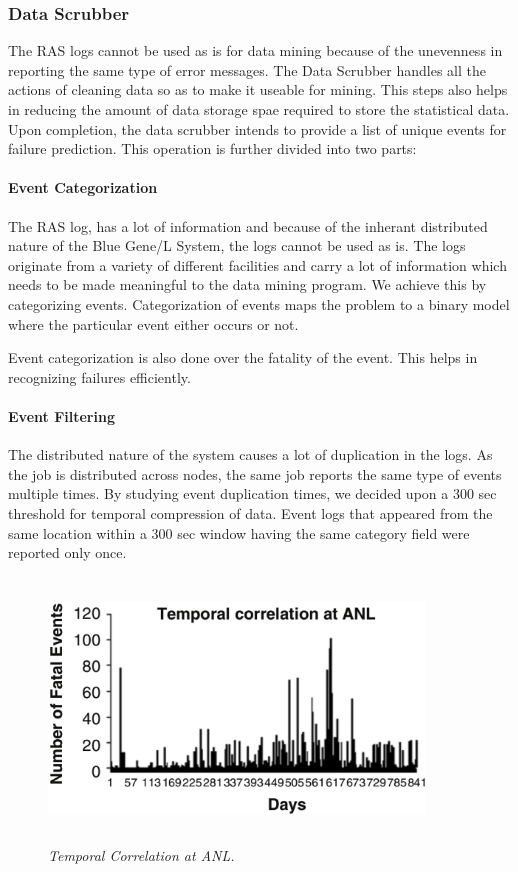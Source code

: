 \subsubsection{Data Scrubber}
The RAS logs cannot be used as is for data mining because of the unevenness in reporting the same type of error messages. The Data Scrubber handles all the actions of cleaning data so as to make it useable for mining. This steps also helps in reducing the amount of data storage spae required to store the statistical data. Upon completion, the data scrubber intends to provide a list of unique events for failure prediction. This operation is further divided into two parts:
\paragraph{Event Categorization}
The RAS log, has a lot of information and because of the inherant distributed nature of the Blue Gene/L System, the logs cannot be used as is. The logs originate from a variety of different facilities and carry a lot of information which needs to be made meaningful to the data mining program. We achieve this by categorizing events. Categorization of events maps the problem to a binary model where the particular event either occurs or not.

Event categorization is also done over the fatality of the event. This helps in recognizing failures efficiently.
\paragraph{Event Filtering}
The distributed nature of the system causes a lot of duplication in the logs.\cite{SCRUBBING_1}\cite{FAILURE_2} As the job is distributed across nodes, the same job reports the same type of events multiple times. By studying event duplication times, we decided upon a 300 sec threshold for temporal compression of data. Event logs that appeared from the same location within a 300 sec window having the same category field were reported only once.
\begin{figure}[t]
		\begin{center}
			\includegraphics[width=10cm,height=7cm]{figures/temporal_correlation.eps} 
			\caption{\small \sl Temporal Correlation at ANL.\label{fig:Label7}} 
		\end{center} 
	\end{figure}


